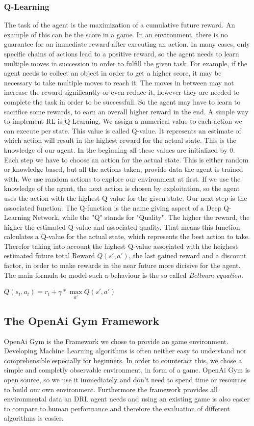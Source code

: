 	\subsubsection{Q-Learning}
		The task of the agent is the maximization of a cumulative future reward. An example of this can be the score in a game. In an environment, there is no guarantee for an immediate reward after executing an action. In many cases, only specific chains of actions lead to a positive reward, so the agent needs to learn multiple moves in succession in order to fulfill the given task. For example, if the agent needs to collect an object in order to get a higher score, it may be necessary to take multiple moves to reach it. The moves in between may not increase the reward significantly or even reduce it, however they are needed to complete the task in order to be successfull. So the agent may have to learn to sacrifice some rewards, to earn an overall higher reward in the end. A simple way to implement RL is Q-Learning. We assign a numerical value to each action we can execute per state. This value is called Q-value. It represents an estimate of which action will result in the highest reward for the actual state. This is the knowledge of our agent. In the beginning all these values are initialized by 0. Each step we have to choose an action for the actual state. This is either random or knowledge based, but all the actions taken, provide data the agent is trained with. We use random actions to explore our environment at first. If we use the knowledge of the agent, the next action is chosen by exploitation, so the agent uses the action with the highest Q-value for the given state. Our next step is the associated function. The Q-function is the name giving aspect of a Deep Q-Learning Network, while the "Q" stands for "Quality". The higher the reward, the higher the estimated Q-value and associated quality. That means this function calculates a Q-value for the actual state, which represents the best action to take. Therefor taking into account the highest Q-value associated with the heighest estimated future total Reward $Q(s', a')$, the last gained reward and a discount factor, in order to make rewards in the near future more dicisive for the agent. The main formula to model such a behaviour is the so called \textit{Bellman equation}.
		
		$Q(s_t, a_t) = r_t + \gamma * \max\limits_{a'} Q(s', a')$
		

\subsection{The OpenAi Gym Framework}
	OpenAi Gym is the Framework we chose to provide an game environment. Developing Machine Learning algorithms is often neither easy to understand nor comprehensible especially for beginners. In order to counteract this, we chose a simple and completly observable environment, in form of a game. OpenAi Gym is open source, so we use it immediately and don't need to spend time or resources to build our own environment. Furthermore the framework provides all environmental data an DRL agent needs and using an existing game is also easier to compare to human performance and therefore the evaluation of different algorithms is easier. 

